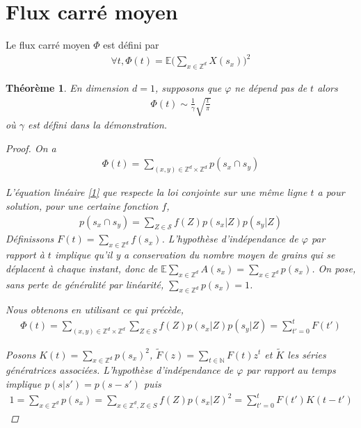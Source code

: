 \documentclass{article}
\newtheorem{theorem}{Théorème}[section]
\theoremstyle{definition}
\begin{document}
\section{Flux carré moyen}
Le flux carré moyen $\Phi$ est défini par 
\begin{align*}
	\forall t, \Phi(t) = \mathbb{E}\bigg(\sum_{x\in\mathbb{Z}^d}X(s_x)\bigg)^2 
\end{align*}

\begin{theorem}
	En dimension $d=1$, supposons que $\varphi$ ne dépend pas de $t$
	alors \begin{align*}
		\Phi(t) \sim \frac{1}{\gamma}\sqrt{\frac{t}{\pi}}
	\end{align*}
	où $\gamma$ est défini dans la démonstration.
	\begin{proof}
		On a \begin{align*}
			\Phi(t) = \sum_{(x,y)\in\mathbb{Z}^d\times\mathbb{Z}^d} p(s_x \cap s_y)
		\end{align*}

		L'équation linéaire \eqref{1} que respecte la loi conjointe sur une même ligne $t$ a pour solution, pour une certaine fonction $f$, 
\begin{align*}
	p(s_x\cap s_y) = \sum_{Z\in \mathcal{S}} f(Z) p(s_x|Z)p(s_y|Z)
\end{align*}
Définissons $F(t) = \sum_{x\in\mathbb{Z}^d}f(s_x)$. L'hypothèse d'indépendance de $\varphi$ par rapport à $t$ implique qu'il y a conservation du nombre moyen de grains qui se déplacent à chaque instant, donc de $\mathbb{E}\sum_{x\in\mathbb{Z}^d}A(s_x)=\sum_{x\in\mathbb{Z}^d}p(s_x)$. On pose, sans perte de généralité par linéarité, $\sum_{x\in\mathbb{Z}^d}p(s_x) = 1$.

Nous obtenons en utilisant ce qui précède,
\begin{align*}
	\Phi(t) = \sum_{(x,y)\in\mathbb{Z}^d\times\mathbb{Z}^d}\sum_{Z\in S} f(Z)p(s_x|Z)p(s_y|Z) = \sum_{t'=0}^t F(t')
\end{align*}

Posons $K(t) = \sum_{x\in\mathbb{Z}^d} p(s_x)^2$, $\tilde{F}(z) = \sum_{t\in \mathbb{N}}F(t) z^t$ et $\tilde{K}$ les séries génératrices associées. L'hypothèse d'indépendance de $\varphi$ par rapport au temps implique $p(s|s')=p(s-s')$ puis
\begin{align*}
	1 = \sum_{x\in\mathbb{Z}^d}p(s_x) = \sum_{x\in\mathbb{Z}^d, Z\in S}f(Z)p(s_x|Z)^2 = \sum_{t'=0}^t F(t')K(t-t')
\end{align*}


\end{proof}
\end{theorem}
\end{document}
